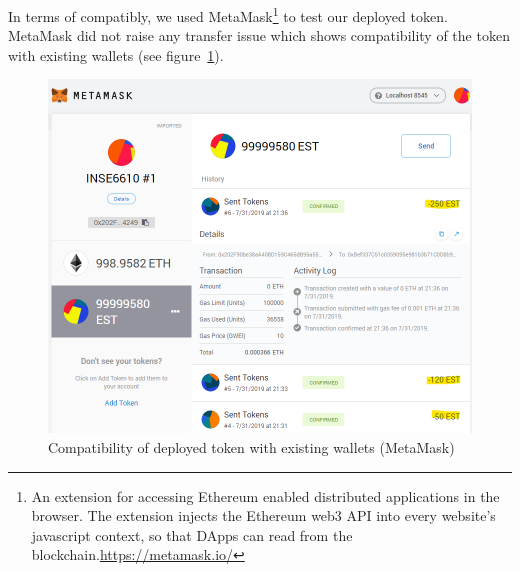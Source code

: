 %
%
%

In terms of compatibly, we used MetaMask\footnote{An extension for accessing Ethereum enabled distributed applications in the browser. The extension injects the Ethereum web3 API into every website's javascript context, so that DApps can read from the blockchain.\url{https://metamask.io/}} to test our deployed token. MetaMask did not raise any transfer issue which shows compatibility of the token with existing wallets (see figure~\ref{fig:propwallet}).

\begin{figure}[t]
	\centering
	\includegraphics[width=0.9\linewidth]{figures/img19.png}
	\caption{Compatibility of deployed token with existing wallets (MetaMask)}
	\label{fig:propwallet}
\end{figure}

